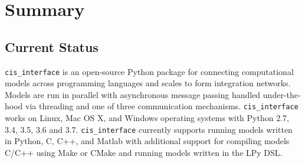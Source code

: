 \documentclass[journal]{IEEEtran}
\newcommand{\cis}{{\tt cis\_interface}{}}
\begin{document}
\section{Summary}\label{S:discuss}

\subsection{Current Status}\label{SS:current}
%
{\cis} is an open-source Python package for connecting computational models across programming languages and scales to form integration networks. Models are run in parallel with asynchronous message passing handled under-the-hood via threading and one of three communication mechanisms. {\cis} works on Linux, Mac OS X, and Windows operating systems with Python 2.7, 3.4, 3.5, 3.6 and 3.7. {\cis} currently supports running models written in Python, C, C++, and Matlab with additional support for compiling models C/C++ using Make \citep{Stallman2004} or CMake \citep{Martin2006} and running models written in the LPy \citep{Boudon2012} DSL.
\end{document}
